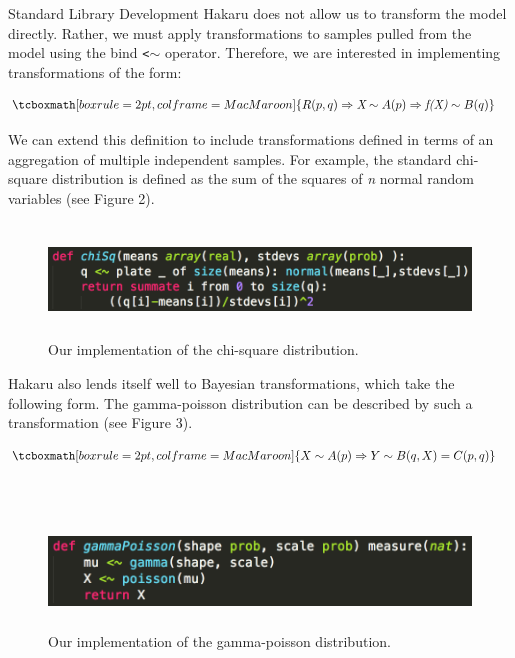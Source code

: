 \documentclass[22pt]{beamer}
\begin{document}
\begin{frame}[fragile]
\begin{textblock}{5}
\begin{textblock}{5}
\begin{block}{\Large{Standard Library Development}}
\footnotesize{Hakaru does not allow us to transform the model directly. Rather, we must apply transformations to samples pulled from the model using the bind {\tt \tiny{<$\sim$}} operator. Therefore, we are interested in implementing transformations of the form:}

\begin{equation*}
\begin{aligned}
& \tcboxmath[boxrule=2pt,colframe=MacMaroon]{R(p, q) \Rightarrow \textit{X} \sim A(p) \Rightarrow \textit{f(X)} \sim B(q)}
\end{aligned}
\end{equation*}

\bigskip

\footnotesize We can extend this definition to include transformations defined in terms of an aggregation of multiple independent samples. For example, the standard chi-square distribution is defined as the sum of the squares of \textit{n} normal random variables (see Figure 2). 

\bigskip
\begin{figure}
\centering
\includegraphics[height=3cm]{chi-square.png}
\caption{\tiny{Our implementation of the chi-square distribution.}}
\end{figure}

\bigskip
\footnotesize{Hakaru also lends itself well to Bayesian transformations, which take the following form. The gamma-poisson distribution can be described by such a transformation (see Figure 3).}

\begin{equation*}
\begin{aligned}
& \tcboxmath[boxrule=2pt,colframe=MacMaroon]{X \sim A(p) \Rightarrow Y \sim B(q, X) = C(p, q)}
\end{aligned}
\end{equation*}

~
~
~

\begin{figure}
\centering
\includegraphics[height=3cm]{gamma-poisson.png}
\caption{\tiny{Our implementation of the gamma-poisson distribution.}}
\end{figure}


\end{block}
\end{textblock}
\end{textblock}
\end{frame}
\end{document}
